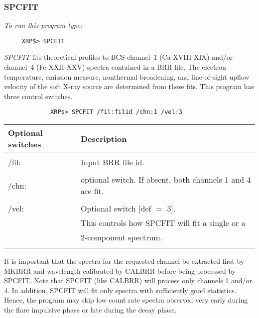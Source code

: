 \subsubsection{SPCFIT}

{\em To run this program type:}
\begin{verbatim}
     XRP$> SPCFIT
\end{verbatim}
{\em SPCFIT} fits theoretical profiles  to  BCS channel~1 (Ca XVIII-XIX) and/or
channel~4 (Fe XXII-XXV) spectra contained in a  BRR file. The electron
temperature, emission measure, nonthermal  broadening, and line-of-sight upflow
velocity of the soft X-ray source are determined from  these fits.
This program has three control switches.
\begin{verbatim}
             XRP$> SPCFIT /fil:filid /chn:1 /vel:3
\end{verbatim}
\begin{center}
\begin{tabular}{|l l|}
\hline
{\bf Optional switches} & {\bf Description}  \\
\hline
              &    \\
        /fil: & Input BRR file id. \\
              &  \\
        /chn: & optional switch. If absent, both channels 1 and 4 are fit. \\
              &  \\
        /vel: & Optional switch [def $=$ 3]. \\
              & This controls how SPCFIT will fit a single or a \\
              & 2-component spectrum. \\
              &    \\
\hline
\end{tabular}
\end{center}
It is important that the spectra for the requested channel be extracted first
by MKBRR and wavelength calibrated by CALBRR before being processed by SPCFIT.
Note that  SPCFIT (like CALBRR) will process only channels 1 and/or 4. In
addition, SPCFIT   will fit only spectra with sufficiently good statistics.
Hence, the program  may skip low count rate spectra observed very early during
the flare impulsive  phase or late during the decay phase.

